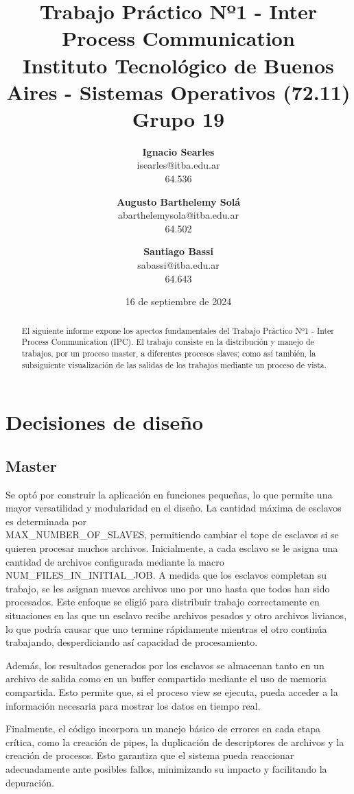 \documentclass{article}
\title{\textbf{Trabajo Práctico Nº1 - Inter Process Communication} \\ [1ex]
\large Instituto Tecnológico de Buenos Aires - Sistemas Operativos (72.11) \\ [1ex]
\large Grupo  19}
\date{16 de septiembre de 2024}
\author{
\textbf{Ignacio Searles}\\
isearles@itba.edu.ar\\
64.536
\and
\textbf{Augusto Barthelemy Solá}\\
abarthelemysola@itba.edu.ar\\
64.502
\and
\textbf{Santiago Bassi}\\
sabassi@itba.edu.ar\\
64.643
}
\begin{document}
\maketitle

\begin{abstract}
El siguiente informe expone los apectos fundamentales del Trabajo Práctico Nº1 - Inter Process Communication (IPC). El trabajo consiste en la distribución y manejo de trabajos, por un proceso master, a diferentes procesos slaves; como así también, la subsiguiente visualización de las salidas de los trabajos mediante un proceso de vista.
\end{abstract}

\section{Decisiones de diseño}

\subsection{Master}
Se optó por construir la aplicación en funciones pequeñas, lo que permite una mayor versatilidad y modularidad en el diseño. La cantidad máxima de esclavos es determinada por \\MAX\_NUMBER\_OF\_SLAVES, permitiendo cambiar el tope de esclavos si se quieren procesar muchos archivos. Inicialmente, a cada esclavo se le asigna una cantidad de archivos configurada mediante la macro NUM\_FILES\_IN\_INITIAL\_JOB. A medida que los esclavos completan su trabajo, se les asignan nuevos archivos uno por uno hasta que todos han sido procesados. Este enfoque se eligió para distribuir trabajo correctamente en situaciones en las que un esclavo recibe archivos pesados y otro archivos livianos, lo que podría causar que uno termine rápidamente mientras el otro continúa trabajando, desperdiciando así capacidad de procesamiento.

Además, los resultados generados por los esclavos se almacenan tanto en un archivo de salida como en un buffer compartido mediante el uso de memoria compartida. Esto permite que, si el proceso view se ejecuta, pueda acceder a la información necesaria para mostrar los datos en tiempo real.

Finalmente, el código incorpora un manejo básico de errores en cada etapa crítica, como la creación de pipes, la duplicación de descriptores de archivos y la creación de procesos. Esto garantiza que el sistema pueda reaccionar adecuadamente ante posibles fallos, minimizando su impacto y facilitando la depuración.
\end{document}
